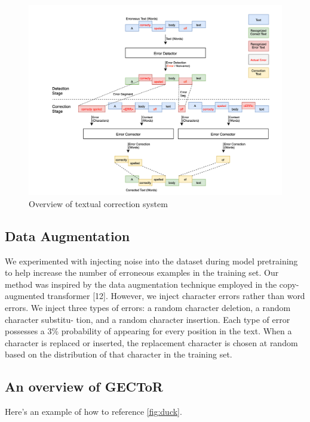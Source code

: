 \documentclass[sigconf, nonacm]{acmart}
\begin{document}
\begin{figure}
    \centering
    \includegraphics[width=1\linewidth]{figures/overview}
    \caption{Overview of textual correction system}
    \label{fig:enter-label}
\end{figure}

\subsection{Data Augmentation}

We experimented with injecting noise into the dataset during model pretraining to help increase the number of erroneous examples in the training set. Our method was inspired by the data augmentation technique employed in the copy- augmented transformer [12]. However, we inject character errors rather than word errors. We inject three types of errors:
a random character deletion, a random character substitu- tion, and a random character insertion. Each type of error possesses a 3\% probability of appearing for every position in the text. When a character is replaced or inserted, the replacement character is chosen at random based on the distribution of that character in the training set.

\subsection{An overview of GECToR}

Here's an example of how to reference \autoref{fig:duck}.
\end{document}
